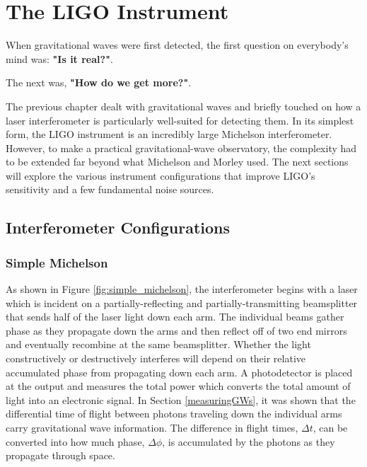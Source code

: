 	\chapter{The LIGO Instrument}\label{chap:LIGOInstrument}
	When gravitational waves were first detected, the first question on everybody's mind was: \textbf{"Is it real?"}. 
	
	The next was, \textbf{"How do we get more?"}.  
	
	The previous chapter dealt with gravitational waves and briefly touched on how a laser interferometer is particularly well-suited for detecting them. In its simplest form, the LIGO instrument is an incredibly large Michelson interferometer. However, to make a practical gravitational-wave observatory, the complexity had to be extended far beyond what Michelson and Morley used.  The next sections will explore the various instrument configurations that improve LIGO's sensitivity and a few fundamental noise sources.
	
	\section{Interferometer Configurations}
	\subsection{Simple Michelson}\label{sec:michelson}
		As shown in Figure \ref{fig:simple_michelson}, the interferometer begins with a laser which is incident on a partially-reflecting and partially-transmitting beamsplitter that sends half of the laser light down each arm.  The individual beams gather phase as they propagate down the arms and then reflect off of two end mirrors and eventually recombine at the same beamsplitter.  Whether the light constructively or destructively interferes will depend on their relative accumulated phase from propagating down each arm. A photodetector is placed at the output and measures the total power which converts the total amount of light into an electronic signal.  In Section \ref{measuringGWs}, it was shown that the differential time of flight between photons traveling down the individual arms carry gravitational wave information.  The difference in flight times, $\Delta t$, can be converted into how much phase, $\Delta \phi$, is accumulated by the photons as they propagate through space.  
		
